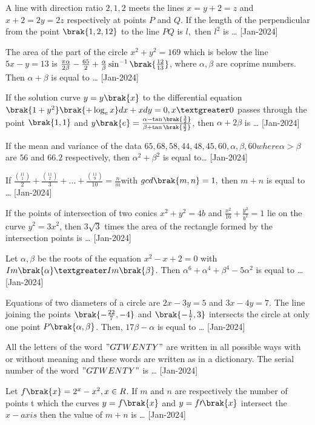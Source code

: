 \iffalse
    \title{2024}
    \author{EE24BTECH11021}
    \section{integer}
\fi
  \item A line with direction ratio $2,1,2$ meets the lines $x=y+2=z$ and $x+2=2y=2z$ respectively at points $P$ and $Q$. If the length of the perpendicular from the point $\brak{1,2,12}$ to the line $PQ$ is $l,$ then $l^2$ is \dots
    \hfill{[Jan-2024]}
    \item The area  of the part of the circle $x^2+y^2=169$ which is below the line $5x-y=13$ is $\frac{\pi\alpha}{2\beta}-\frac{65}{2}+\frac{\alpha}{\beta}\sin^{-1}\brak{\frac{12}{13}}$, where $\alpha,\beta$ are coprime numbers. Then $\alpha+\beta$ is equal to \dots
    \hfill{[Jan-2024]}
    \item If the solution curve $y=y\brak{x}$ to the differential equation $\brak{1+y^2}\brak{+\log_{e}x}dx+x dy=0,x\textgreater 0$ passes through the point $\brak{1,1}$ and $y\brak{e}=\frac{\alpha-\tan\brak{\frac{3}{2}}}{\beta+\tan\brak{\frac{3}{2}}}$, then $\alpha+2\beta$ is \dots
    \hfill{[Jan-2024]}
    \item If the mean and variance of the data $65, 68, 58, 44, 48, 45, 60, \alpha, \beta, 60 where \alpha > \beta$ are $56$ and $66.2$ respectively, then $\alpha^2+\beta^2$ is equal to\dots
    \hfill{[Jan-2024]}
    \item If $\frac{\binom{11}{1}}{2}+\frac{\binom{11}{2}}{3}+\dots+\frac{\binom{11}{9}}{10}=\frac{n}{m}$with $gcd\brak{m,n}=1,$ then $m+n$ is equal to \dots 
    \hfill{[Jan-2024]}
    \item If the points of intersection of two conics $x^2+y^2=4b$ and $\frac{x^2}{16}+\frac{y^2}{b^2}=1$ lie on the curve $y^2=3x^2$, then $3\sqrt{3}$ times the area of the rectangle formed by the intersection points is \dots
    \hfill{[Jan-2024]}
    \item Let $\alpha,\beta$ be the roots of the equation $x^2-x+2=0$ with $Im\brak{\alpha}\textgreater Im\brak{\beta}$. Then $\alpha^6+\alpha^4+\beta^4-5\alpha^2$ is equal to \dots
    \hfill{[Jan-2024]}
    \item Equations of two diameters of a circle are $2x-3y=5$ and $3x-4y=7$. The line joining the points $\brak{-\frac{22}{7},-4}$ and $\brak{-\frac{1}{7},3}$ intersects the circle at only one point $P\brak{\alpha,\beta}$. Then, $17\beta-\alpha$ is equal to \dots
    \hfill{[Jan-2024]}
    \item All the letters of the word $"GTWENTY"$ are written in all possible ways with or without meaning and these words are written as in a dictionary. The serial number of the word $"GTWENTY"$ is \dots
    \hfill{[Jan-2024]}
    \item Let $f\brak{x}=2^x-x^2,x\in R$. If $m$ and $n$ are respectively the number of points t which the curves $y=f\brak{x}$ and $y=f\prime\brak{x}$ intersect the $x-axis$ then the value of $m+n$ is \dots
    \hfill{[Jan-2024]}
